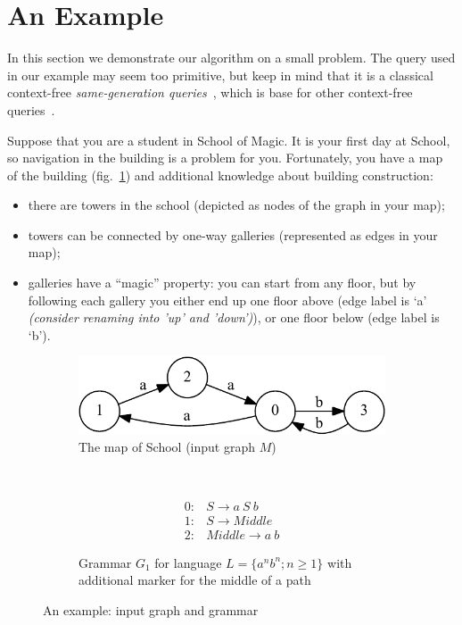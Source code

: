 \section{An Example}\label{motivExample}

In this section we demonstrate our algorithm on a small problem.
The query used in our example may seem too primitive, but keep in mind that it is a classical context-free \textit{same-generation queries}~\cite{FndDB}, which is base for other context-free queries~\cite{GraphQueryWithEarley}.

Suppose that you are a student in School of Magic.
It is your first day at School, so navigation in the building is a problem for you.
Fortunately, you have a map of the building (fig.~\ref{input}) and additional knowledge about building construction:
\begin{itemize}
  \item there are towers in the school (depicted as nodes of the graph in your map);
  \item towers can be connected by one-way galleries (represented as edges in your map);
  \item galleries have a ``magic'' property: you can start from any floor, but by following each gallery you either end up one floor above (edge label is `a' \emph{(consider renaming into 'up' and 'down')}), or one floor below (edge label is `b'). 
\end{itemize}

\begin{figure}[h]
    \begin{center}
	\centering
    \begin{subfigure}[b]{0.45\textwidth}
        \includegraphics[width=\textwidth]{dot/input.pdf}
        \caption{The map of School (input graph $M$)}
        \label{input}        
		\vspace{1cm}
	\end{subfigure}
	~	
	\begin{subfigure}[b]{0.45\textwidth}
   \[
\begin{array}{rl} 
   0:& S \rightarrow a \ S \ b \\
   1:& S \rightarrow Middle \\
   2:& Middle \rightarrow a \ b
\end{array}
\]
   \caption{Grammar $G_1$ for language $L=\{a^n b^n; n \geq 1\}$ with additional marker for the middle of a path}
   \label{grammarG}        
	\end{subfigure}
    \end{center}
\caption{An example: input graph and grammar}
\label{exampleData}
\end{figure}


